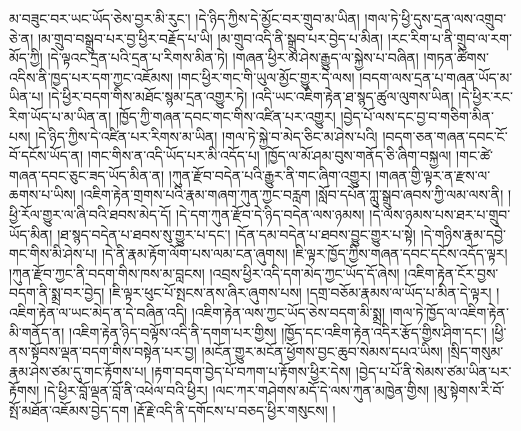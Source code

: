 མ་བཟུང་བར་ཡང་ཡོད་ཅེས་བྱར་མི་རུང་། །དེ་ཉིད་ཀྱིས་དེ་མྱོང་བར་གྲུབ་མ་ཡིན། །གལ་ཏེ་ཕྱི་དུས་དྲན་ལས་འགྲུབ་ཅེ་ན། །མ་གྲུབ་བསྒྲུབ་པར་བྱ་ཕྱིར་བརྗོད་པ་ཡི། །མ་གྲུབ་འདི་ནི་སྒྲུབ་པར་བྱེད་པ་མིན། །རང་རིག་པ་ནི་གྲུབ་ལ་རག་མོད་ཀྱི། །དེ་ལྟའང་དྲན་པའི་དྲན་པ་རིགས་མིན་ཏེ། །གཞན་ཕྱིར་མ་ཤེས་རྒྱུད་ལ་སྐྱེས་པ་བཞིན། །གཏན་ཚིགས་འདིས་ནི་ཁྱད་པར་དག་ཀྱང་འཇོམས། །གང་ཕྱིར་གང་གི་ཡུལ་མྱོང་གྱུར་དེ་ལས། །བདག་ལས་དྲན་པ་གཞན་ཡོད་མ་ཡིན་པ། །དེ་ཕྱིར་བདག་གིས་མཐོང་སྙམ་དྲན་འགྱུར་ཏེ། །འདི་ཡང་འཇིག་རྟེན་ཐ་སྙད་ཚུལ་ལུགས་ཡིན། །དེ་ཕྱིར་རང་རིག་ཡོད་པ་མ་ཡིན་ན། །ཁྱོད་ཀྱི་གཞན་དབང་གང་གིས་འཛིན་པར་འགྱུར། །བྱེད་པོ་ལས་དང་བྱ་བ་གཅིག་མིན་པས། །དེ་ཉིད་ཀྱིས་དེ་འཛིན་པར་རིགས་མ་ཡིན། །གལ་ཏེ་སྐྱེ་བ་མེད་ཅིང་མ་ཤེས་པའི། །བདག་ཅན་གཞན་དབང་ངོ་བོ་དངོས་ཡོད་ན། །གང་གིས་ན་འདི་ཡོད་པར་མི་འདོད་པ། །ཁྱོད་ལ་མོ་ཤམ་བུས་གནོད་ཅི་ཞིག་བསྐྱལ། །གང་ཚེ་གཞན་དབང་ཅུང་ཟད་ཡོད་མིན་ན། །ཀུན་རྫོབ་བདེན་པའི་རྒྱུར་ནི་གང་ཞིག་འགྱུར། །གཞན་གྱི་ལྟར་ན་རྫས་ལ་ཆགས་པ་ཡིས། །འཇིག་རྟེན་གྲགས་པའི་རྣམ་གཞག་ཀུན་ཀྱང་བརླག །སློབ་དཔོན་ཀླུ་སྒྲུབ་ཞབས་ཀྱི་ལམ་ལས་ནི། །ཕྱི་རོལ་གྱུར་ལ་ཞི་བའི་ཐབས་མེད་དོ། །དེ་དག་ཀུན་རྫོབ་དེ་ཉིད་བདེན་ལས་ཉམས། །དེ་ལས་ཉམས་པས་ཐར་པ་གྲུབ་ཡོད་མིན། །ཐ་སྙད་བདེན་པ་ཐབས་སུ་གྱུར་པ་དང་། །དོན་དམ་བདེན་པ་ཐབས་བྱུང་གྱུར་པ་སྟེ། །དེ་གཉིས་རྣམ་དབྱེ་གང་གིས་མི་ཤེས་པ། །དེ་ནི་རྣམ་རྟོག་ལོག་པས་ལམ་ངན་ཞུགས། །ཇི་ལྟར་ཁྱོད་ཀྱིས་གཞན་དབང་དངོས་འདོད་ལྟར། །ཀུན་རྫོབ་ཀྱང་ནི་བདག་གིས་ཁས་མ་བླངས། །འབྲས་ཕྱིར་འདི་དག་མེད་ཀྱང་ཡོད་དོ་ཞེས། །འཇིག་རྟེན་ངོར་བྱས་བདག་ནི་སྨྲ་བར་བྱེད། །ཇི་ལྟར་ཕུང་པོ་སྤངས་ནས་ཞིར་ཞུགས་པས། །དགྲ་བཅོམ་རྣམས་ལ་ཡོད་པ་མིན་དེ་ལྟར། །འཇིག་རྟེན་ལ་ཡང་མེད་ན་དེ་བཞིན་འདི། །འཇིག་རྟེན་ལས་ཀྱང་ཡོད་ཅེས་བདག་མི་སྨྲ། །གལ་ཏེ་ཁྱོད་ལ་འཇིག་རྟེན་མི་གནོད་ན། །འཇིག་རྟེན་ཉིད་བལྟོས་འདི་ནི་དགག་པར་གྱིས། །ཁྱོད་དང་འཇིག་རྟེན་འདིར་རྩོད་གྱིས་ཤིག་དང་། །ཕྱི་ནས་སྟོབས་ལྡན་བདག་གིས་བསྟེན་པར་བྱ། །མངོན་གྱུར་མངོན་ཕྱོགས་བྱང་ཆུབ་སེམས་དཔའ་ཡིས། །སྲིད་གསུམ་རྣམ་ཤེས་ཙམ་དུ་གང་རྟོགས་པ། །རྟག་བདག་བྱེད་པོ་བཀག་པ་རྟོགས་ཕྱིར་དེས། །བྱེད་པ་པོ་ནི་སེམས་ཙམ་ཡིན་པར་རྟོགས། །དེ་ཕྱིར་བློ་ལྡན་བློ་ནི་འཕེལ་བའི་ཕྱིར། །ལང་ཀར་གཤེགས་མདོ་དེ་ལས་ཀུན་མཁྱེན་གྱིས། །མུ་སྟེགས་རི་བོ་སྤོ་མཐོན་འཇོམས་བྱེད་དག །རྡོ་རྗེ་འདི་ནི་དགོངས་པ་བཅད་ཕྱིར་གསུངས། །
